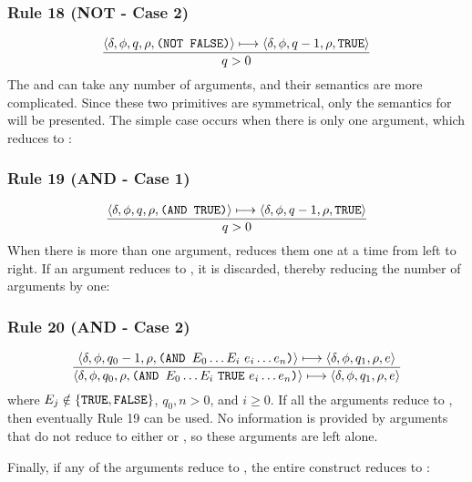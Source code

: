 \subsubsection*{Rule 18 (NOT - Case 2)}
\[
\frac{\langle \delta,\phi,q,\rho,\texttt{(NOT FALSE)}\rangle\longmapsto
      \langle \delta,\phi,q-1,\rho,\texttt{TRUE}\rangle}
     {q>0}
\]
The  and  can take any number of arguments, and their
semantics are more complicated. Since these two primitives are symmetrical, only
the semantics for  will be presented. The simple case occurs when
there is only one argument, which reduces to :

\subsubsection*{Rule 19 (AND - Case 1)}
\[
\frac{\langle \delta,\phi,q,\rho,\texttt{(AND TRUE)}\rangle\longmapsto
      \langle \delta,\phi,q-1,\rho,\texttt{TRUE}\rangle}
     {q>0}
\]
When there is more than one argument,  reduces them one at a time from
left to right. If an argument reduces to , it is discarded, thereby
reducing the number of arguments by one:

\subsubsection*{Rule 20 (AND - Case 2)}
\[
\frac{
\cfg{\delta}{\phi}{q_0-1}{\rho}{\THOR{(AND }E_0\ldots E_i\ e_i\ldots e_n\THOR{)}}\redsto
\cfg{\delta}{\phi}{q_1}{\rho}{e}
}{
\cfg{\delta}{\phi}{q_0}{\rho}{\THOR{(AND }E_0\ldots E_i\ \THOR{TRUE}\ e_i\ldots e_n\THOR{)}}\redsto
\cfg{\delta}{\phi}{q_1}{\rho}{e}
}
\]
where \(E_j\notin\{\texttt{TRUE},\texttt{FALSE}\}\), \(q_0,n>0\), and \(i\ge0\).
If all the arguments reduce to , then eventually Rule 19 can be used.
No information is provided by arguments that do not reduce to either
 or , so these arguments are left alone.

Finally, if any of the arguments reduce to , the entire 
construct reduces to :

